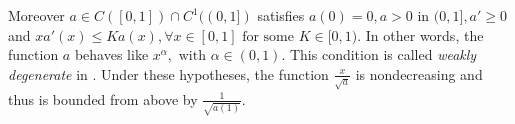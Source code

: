 \documentclass[11pt,oneside,a4papper]{osajnl}
\begin{document}
Moreover $a \in C([0,1]) \cap C^1((0,1])$ satisfies $a(0) = 0, a > 0 \text{ in } (0,1], a' \ge 0$ and  $xa'(x)\leq K a(x), \forall x \in [0,1] \text{ for some } K \in [0,1).$ In other words, the function $a$ behaves like  $x^\alpha, \text{ with } \alpha \in (0,1)$. This condition is called  \emph{weakly degenerate} in \cite{Alabau_cannarsa_fragnelli-06}.
Under these hypotheses, the function $\frac{x}{\sqrt{a}}$ is nondecreasing and thus is bounded from above by $\frac{1}{\sqrt{a(1)}}$.




\end{document}
